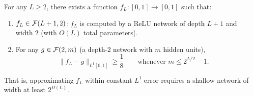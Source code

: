 \documentclass[11pt,a4paper]{article}
\begin{document}
\begin{theorem}
\label{thm:depth-separation}
For any $L \ge 2$, there exists a function $f_L \colon [0,1] \to [0,1]$
such that:
\begin{enumerate}[nosep,label=(\roman*)]
  \item $f_L \in \mathcal{F}(L+1, 2)$: $f_L$ is computed by a ReLU network
    of depth $L+1$ and width $2$ (with $O(L)$ total parameters).
  \item For any $g \in \mathcal{F}(2, m)$ (a depth-$2$ network with $m$
    hidden units),
    \[
      \|f_L - g\|_{L^1[0,1]} \ge \frac{1}{8}
      \qquad \text{whenever } m \le 2^{L/2} - 1.
    \]
\end{enumerate}
That is, approximating $f_L$ within constant $L^1$ error requires
a shallow network of width at least $2^{\Omega(L)}$.
\end{theorem}
\end{document}
